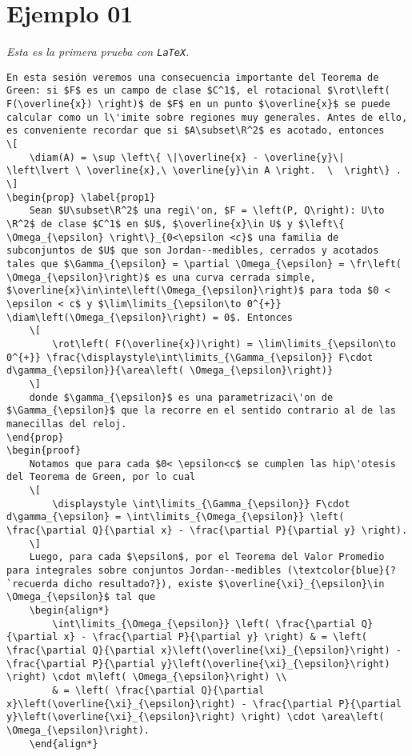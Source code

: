 \documentclass[
]{krantz}
\newtheorem{prop}[teo]{Proposici\'on}
\theoremstyle{definition}
\newcommand{\R}{\mathbb{R}}  %
\renewcommand{\epsilon}{\varepsilon}  %
\DeclareMathOperator{\inte}{int}
\DeclareMathOperator{\fr}{Fr}
\DeclareMathOperator{\rot}{Rot}
\DeclareMathOperator{\diam}{di\acute{a}m}
\DeclareMathOperator{\area}{\acute{a}rea}
\theoremstyle{definition}
\theoremstyle{definition}
\theoremstyle{definition}
\theoremstyle{remark}
\begin{document}
\hypertarget{ejemplo-01}{%
\chapter{Ejemplo 01}\label{ejemplo-01}}

\emph{Esta es la primera prueba con \texttt{LaTeX}.}

\begin{verbatim}
En esta sesión veremos una consecuencia importante del Teorema de Green: si $F$ es un campo de clase $C^1$, el rotacional $\rot\left( F(\overline{x}) \right)$ de $F$ en un punto $\overline{x}$ se puede calcular como un l\'imite sobre regiones muy generales. Antes de ello, es conveniente recordar que si $A\subset\R^2$ es acotado, entonces
\[
    \diam(A) = \sup \left\{ \|\overline{x} - \overline{y}\| \left\lvert \ \overline{x},\ \overline{y}\in A \right.  \  \right\} .
\]
\begin{prop} \label{prop1}
    Sean $U\subset\R^2$ una regi\'on, $F = \left(P, Q\right): U\to \R^2$ de clase $C^1$ en $U$, $\overline{x}\in U$ y $\left\{ \Omega_{\epsilon} \right\}_{0<\epsilon <c}$ una familia de subconjuntos de $U$ que son Jordan--medibles, cerrados y acotados tales que $\Gamma_{\epsilon} = \partial \Omega_{\epsilon} = \fr\left( \Omega_{\epsilon}\right)$ es una curva cerrada simple, $\overline{x}\in\inte\left(\Omega_{\epsilon}\right)$ para toda $0 < \epsilon < c$ y $\lim\limits_{\epsilon\to 0^{+}} \diam\left(\Omega_{\epsilon}\right) = 0$. Entonces
    \[
        \rot\left( F(\overline{x})\right) = \lim\limits_{\epsilon\to 0^{+}} \frac{\displaystyle\int\limits_{\Gamma_{\epsilon}} F\cdot d\gamma_{\epsilon}}{\area\left( \Omega_{\epsilon}\right)}
    \]
    donde $\gamma_{\epsilon}$ es una parametrizaci\'on de $\Gamma_{\epsilon}$ que la recorre en el sentido contrario al de las manecillas del reloj.
\end{prop}
\begin{proof}
    Notamos que para cada $0< \epsilon<c$ se cumplen las hip\'otesis del Teorema de Green, por lo cual
    \[
        \displaystyle \int\limits_{\Gamma_{\epsilon}} F\cdot d\gamma_{\epsilon} = \int\limits_{\Omega_{\epsilon}} \left( \frac{\partial Q}{\partial x} - \frac{\partial P}{\partial y} \right).
    \]
    Luego, para cada $\epsilon$, por el Teorema del Valor Promedio para integrales sobre conjuntos Jordan--medibles (\textcolor{blue}{?`recuerda dicho resultado?}), existe $\overline{\xi}_{\epsilon}\in \Omega_{\epsilon}$ tal que
    \begin{align*}
        \int\limits_{\Omega_{\epsilon}} \left( \frac{\partial Q}{\partial x} - \frac{\partial P}{\partial y} \right) & = \left( \frac{\partial Q}{\partial x}\left(\overline{\xi}_{\epsilon}\right) - \frac{\partial P}{\partial y}\left(\overline{\xi}_{\epsilon}\right) \right) \cdot m\left( \Omega_{\epsilon}\right) \\
        & = \left( \frac{\partial Q}{\partial x}\left(\overline{\xi}_{\epsilon}\right) - \frac{\partial P}{\partial y}\left(\overline{\xi}_{\epsilon}\right) \right) \cdot \area\left( \Omega_{\epsilon}\right).
    \end{align*}


\end{verbatim}
\end{document}
